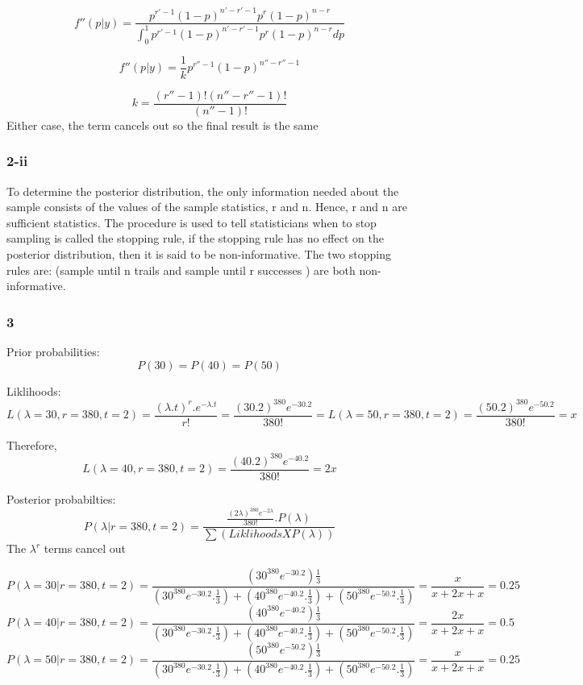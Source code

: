 \documentclass[]{article}
\begin{document}
\[f''(p|y) = \frac{p^{r'-1}(1-p)^{n'-r'-1}p^r(1-p)^{n-r}}{\int_{0}^{1}p^{r'-1}(1-p)^{n'-r'-1}p^r(1-p)^{n-r}dp}\]

\[f''(p|y) = \frac{1}{k}p^{r''-1}(1-p)^{n''-r''-1}\]

\[k = \frac{(r''-1)!(n''-r''-1)!}{(n''-1)!}\] Either case, the term
cancels out so the final result is the same

\subsubsection{2-ii}\label{ii}

To determine the posterior distribution, the only information needed
about the sample consists of the values of the sample statistics, r and
n. Hence, r and n are sufficient statistics. The procedure is used to
tell statisticians when to stop sampling is called the stopping rule, if
the stopping rule has no effect on the posterior distribution, then it
is said to be non-informative. The two stopping rules are: (sample until
n trails and sample until r successes ) are both non-informative.

\subsubsection{3}\label{section}

Prior probabilities: \[
P(30) = P(40) = P(50)
\]

Liklihoods: \[
L(\lambda = 30,r=380,t=2)
= \frac{(\lambda.t)^r.e^{-\lambda.t}}{r!}
=\frac{(30.2)^{380}e^{-30.2}}{380!}
=L(\lambda = 50,r=380,t=2)
= \frac{(50.2)^{380}e^{-50.2}}{380!}
= x
\]

Therefore, \[
L(\lambda = 40,r=380,t=2)= \frac{(40.2)^{380}e^{-40.2}}{380!} = 2x
\]

Posterior probabilties: \[
P(\lambda|r=380,t=2)=\frac{\frac{(2\lambda)^{380}e^{-2\lambda}}{380!}.P(\lambda)}{\sum(LiklihoodsXP(\lambda))}
\] The \(\lambda^r\) terms cancel out

\[
P(\lambda=30|r=380,t=2) = \frac{(30^{380}e^{-30.2})\frac{1}{3}}{(30^{380}e^{-30.2}.\frac{1}{3})
+(40^{380}e^{-40.2}.\frac{1}{3})
+(50^{380}e^{-50.2}.\frac{1}{3})}
= \frac{x}{x+2x+x} = 0.25
\] \[
P(\lambda=40|r=380,t=2) = \frac{(40^{380}e^{-40.2})\frac{1}{3}}{(30^{380}e^{-30.2}.\frac{1}{3})
+(40^{380}e^{-40.2}.\frac{1}{3})
+(50^{380}e^{-50.2}.\frac{1}{3})}
= \frac{2x}{x+2x+x} = 0.5
\] \[
P(\lambda=50|r=380,t=2) = \frac{(50^{380}e^{-50.2})\frac{1}{3}}{(30^{380}e^{-30.2}.\frac{1}{3})
+(40^{380}e^{-40.2}.\frac{1}{3})
+(50^{380}e^{-50.2}.\frac{1}{3})}
= \frac{x}{x+2x+x} = 0.25
\]
\end{document}
